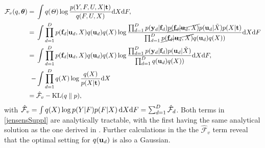 \documentclass{article} %
\begin{document}
\begin{align}
\mathcal{F}_v(q, \boldsymbol \theta) = {}& \int q(\mathit{\Theta}) \log 
		\frac{ p(Y,F, U,X | \mathbf{t})}
			 {q(F, U,X)}  \text{d}  X \text{d} F,
 	    \nonumber \\
= {}& \int \prod_{d=1}^D p(\mathbf{f}_d | \mathbf{u}_d, X )q(\mathbf{u}_d) q(X) 
	    \log  \frac{\prod_{d=1}^D p(\mathbf{y}_d | \mathbf{f}_d) \cancel{p(\mathbf{f}_d | \mathbf{u}_d, \mathit{X})}
						p(\mathbf{u}_d | \tilde{X})  p(X | \mathbf{t})}
 	      		   {\prod_{d=1}^D \cancel{p(\mathbf{f}_d | \mathbf{u}_d, X )}q(\mathbf{u}_d) q(X))}   \text{d}  X \text{d} F \nonumber \\
= {}& \int \prod_{d=1}^D p(\mathbf{f}_d | \mathbf{u}_d, X )q(\mathbf{u}_d) q(X) 
		\log  \frac{\prod_{d=1}^D p(\mathbf{y}_d | \mathbf{f}_d) p(\mathbf{u}_d | \tilde{X})}
				   {\prod_{d=1}^D q(\mathbf{u}_d) q(X))}   \text{d}  X \text{d} F, \nonumber \\
- {}& \int \prod_{d=1}^D  q(X)   \log \frac{q(X)}{p(X | \mathbf{t})}   \text{d}  X \nonumber \\
= {}& \hat{\mathcal{F}}_v - \text{KL}(q \parallel p), \label{jensensSuppl}
\end{align}
%
with $\hat{\mathcal{F}}_v =\int q(X) \log p( Y | F ) p( F | X) \,
\mathrm{d} X \text{d} F = \sum_{d=1}^D \hat{\mathcal{F}}_d$. Both terms in \eqref{jensensSuppl} are analytically tractable, with the first having the same analytical solution as the one derived in \cite{BayesianGPLVM}. Further calculations in the the $\hat{\mathcal{F}}_v$ term reveal that the optimal setting for $q(\mathbf{u}_d)$ is also a Gaussian.
\end{document}
